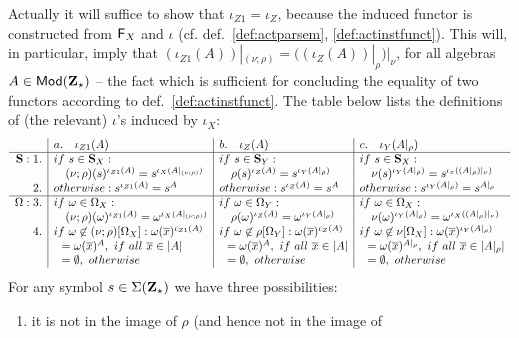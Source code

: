 \begin{PROOF}
Actually it will suffice to show that $\iota_{Z1}=\iota_Z$, 
because the induced functor is constructed from ${\sf {F}}_X$ and $\iota$ (cf. def.~\ref{def:actparsem}, \ref{def:actinstfunct}). This
will, in particular, imply that  $(\iota_{Z1}(A))|_{(\nu;\rho)} =
((\iota_{Z}(A))|_{\rho})|_{\nu}$, for all algebras $A \in
{\sf {Mod}}({\bf Z_\star})$ -- the fact which is sufficient for concluding the
equality of two functors according to def.~\ref{def:actinstfunct}. The table
below lists the definitions of (the relevant) $\iota$'s induced by $\iota_X:$
\[\begin{array}{r|l|l|l}
     & a.\ \ \ \iota_{Z1}(A)   &  b.\ \ \ \iota_{Z}(A)  & c.\ \ \ \iota_Y(A|_\rho)\\ \hline
\Sorts:1.& if\ s \in \Sorts_X: & if\ s \in \Sorts_Y: & if\ s \in \Sorts_X: \\
  & \ \ \ (\nu;\rho)(s)^{\iota_{Z1}(A)}= s^{\iota_{X}(A|_{(\nu;\rho)})} &
  \ \ \ \rho(s)^{\iota_{Z}(A)}= s^{\iota_{Y}(A|_{\rho})}  &
  \ \ \ \nu(s)^{\iota_{Y}(A|_{\rho})}= s^{\iota_{x}((A|_{\rho})|_\nu)} 
\\
2.  & otherwise:{s}^{\iota_{Z1}(A)}= {s}^{A} &
    otherwise: {s}^{\iota_{Z}(A)}= {s}^{A} &
    otherwise: {s}^{\iota_{Y}(A|_\rho)}= {s}^{A|_{\rho}} 
\\ \hline
\Ops: 3.& 
  if\ \omega \in \Ops_{X}: & if\ \omega \in \Ops_{Y}: & if\ \omega \in \Ops_{X}:  
\\
 & \ \ \ (\nu;\rho)(\omega)^{\iota_{Z1}(A)}=   \omega^{\iota_{X}(A|_{(\nu;\rho)})} 
 & \ \ \  \rho(\omega)^{\iota_{Z}(A)}=   \omega^{\iota_{Y}(A|_{\rho})} 
 & \ \ \  \nu(\omega)^{\iota_{Y}(A|_\rho)}=   \omega^{\iota_{X}((A|_{\rho})|_\nu)} 
\\
4.  &  if\ \omega\not\in(\nu;\rho)[\Ops_X]: \omega(\ovr x)^{\iota_{Z1}(A)}
    &  if\ \omega\not\in\rho[\Ops_Y]: \omega(\ovr x)^{\iota_{Z}(A)}
    &  if\ \omega\not\in\nu[\Ops_X]: \omega(\ovr x)^{\iota_{Y}(A|_{\rho})}
\\
  & \ \ = \omega(\ovr x)^{A},\ if\ all\ \ovr x \in |A|
  & \ \ = \omega(\ovr x)^{A},\ if\ all\ \ovr x \in |A|
  & \ \ = \omega(\ovr x)^{A|_{\rho}},\ if\ all\ \ovr x \in |A|_\rho|
\\
 & \ \ = \emptyset,\ otherwise 
 & \ \ = \emptyset,\ otherwise 
 & \ \ = \emptyset,\ otherwise 
\end{array}
\]
For any symbol $s\in\Sigma({\bf Z_\star})$ we have three possibilities:
\begin{enumerate}\MyLPar
\item it is not in the image of $\rho$ (and hence not in the image of

\end{enumerate}
\end{PROOF}
